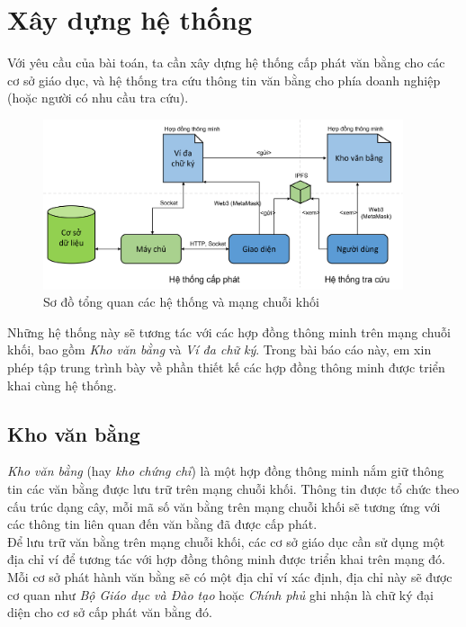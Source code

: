 \newpage
\section{Xây dựng hệ thống}

Với yêu cầu của bài toán, ta cần xây dựng hệ thống cấp phát văn bằng cho các cơ sở giáo dục, và hệ thống tra cứu thông tin văn bằng cho phía doanh nghiệp (hoặc người có nhu cầu tra cứu).\\

\begin{figure}[ht]
    \centering
    \includegraphics[width=400px]{anh/giai-phap/tong-quan-he-thong.png}
    \caption{Sơ đồ tổng quan các hệ thống và mạng chuỗi khối}
    \label{images/system-overview}
\end{figure}

Những hệ thống này sẽ tương tác với các hợp đồng thông minh trên mạng chuỗi khối, bao gồm \textit{Kho văn bằng} và \textit{Ví đa chữ ký}. Trong bài báo cáo này, em xin phép tập trung trình bày về phần thiết kế các hợp đồng thông minh được triển khai cùng hệ thống.


\subsection{Kho văn bằng}
\textit{Kho văn bằng} (hay \textit{kho chứng chỉ}) là một hợp đồng thông minh nắm giữ thông tin các văn bằng được lưu trữ trên mạng chuỗi khối. Thông tin được tổ chức theo cấu trúc dạng cây, mỗi mã số văn bằng trên mạng chuỗi khối sẽ tương ứng với các thông tin liên quan đến văn bằng đã được cấp phát.\\

Để lưu trữ văn bằng trên mạng chuỗi khối, các cơ sở giáo dục cần sử dụng một địa chỉ ví để tương tác với hợp đồng thông minh được triển khai trên mạng đó. Mỗi cơ sở phát hành văn bằng sẽ có một địa chỉ ví xác định, địa chỉ này sẽ được cơ quan như \textit{Bộ Giáo dục và Đào tạo} hoặc \textit{Chính phủ} ghi nhận là chữ ký đại diện cho cơ sở cấp phát văn bằng đó.\\

